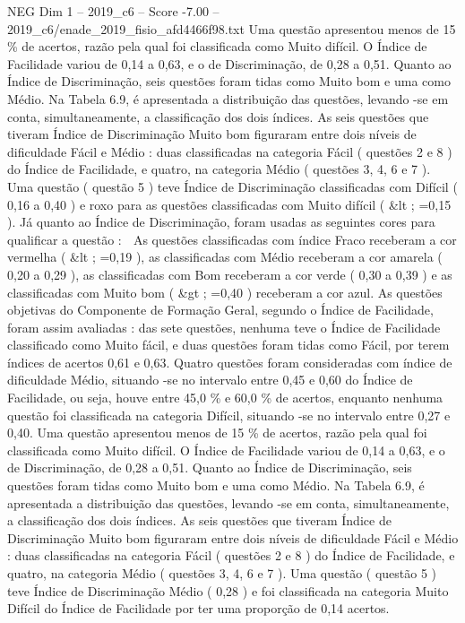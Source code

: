 \begin{textsample}{NEG Dim 1 – 2019\_c6 – Score -7.00 – 2019\_c6/enade\_2019\_fisio\_afd4466f98.txt}
Uma questão apresentou menos de 15 \% de acertos, razão pela qual foi classificada como Muito difícil.
O Índice de Facilidade variou de 0,14 a 0,63, e o de Discriminação, de 0,28 a 0,51.
Quanto ao Índice de Discriminação, seis questões foram tidas como Muito bom e uma como Médio.
Na Tabela 6.9, é apresentada a distribuição das questões, levando -se em conta, simultaneamente, a classificação dos dois índices.
As seis questões que tiveram Índice de Discriminação Muito bom figuraram entre dois níveis de dificuldade Fácil e Médio : duas classificadas na categoria Fácil ( questões 2 e 8 ) do Índice de Facilidade, e quatro, na categoria Médio ( questões 3, 4, 6 e 7 ).
Uma questão ( questão 5 ) teve Índice de Discriminação classificadas com Difícil ( 0,16 a 0,40 ) e roxo para as questões classificadas com Muito difícil ( \&lt ; =0,15 ).
Já quanto ao Índice de Discriminação, foram usadas as seguintes cores para qualificar a questão :  As questões classificadas com índice Fraco receberam a cor vermelha ( \&lt ; =0,19 ), as classificadas com Médio receberam a cor amarela ( 0,20 a 0,29 ), as classificadas com Bom receberam a cor verde ( 0,30 a 0,39 ) e as classificadas com Muito bom ( \&gt ; =0,40 ) receberam a cor azul.
As questões objetivas do Componente de Formação Geral, segundo o Índice de Facilidade, foram assim avaliadas : das sete questões, nenhuma teve o Índice de Facilidade classificado como Muito fácil, e duas questões foram tidas como Fácil, por terem índices de acertos 0,61 e 0,63.
Quatro questões foram consideradas com índice de dificuldade Médio, situando -se no intervalo entre 0,45 e 0,60 do Índice de Facilidade, ou seja, houve entre 45,0 \% e 60,0 \% de acertos, enquanto nenhuma questão foi classificada na categoria Difícil, situando -se no intervalo entre 0,27 e 0,40.
Uma questão apresentou menos de 15 \% de acertos, razão pela qual foi classificada como Muito difícil.
O Índice de Facilidade variou de 0,14 a 0,63, e o de Discriminação, de 0,28 a 0,51.
Quanto ao Índice de Discriminação, seis questões foram tidas como Muito bom e uma como Médio.
Na Tabela 6.9, é apresentada a distribuição das questões, levando -se em conta, simultaneamente, a classificação dos dois índices.
As seis questões que tiveram Índice de Discriminação Muito bom figuraram entre dois níveis de dificuldade Fácil e Médio : duas classificadas na categoria Fácil ( questões 2 e 8 ) do Índice de Facilidade, e quatro, na categoria Médio ( questões 3, 4, 6 e 7 ).
Uma questão ( questão 5 ) teve Índice de Discriminação Médio ( 0,28 ) e foi classificada na categoria Muito Difícil do Índice de Facilidade por ter uma proporção de 0,14 acertos.

\end{textsample}
